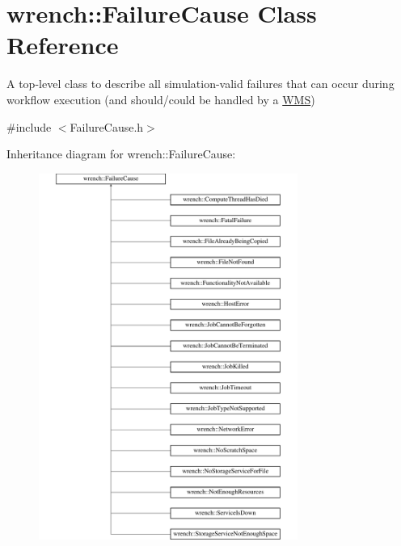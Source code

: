 \hypertarget{classwrench_1_1_failure_cause}{}\section{wrench\+:\+:Failure\+Cause Class Reference}
\label{classwrench_1_1_failure_cause}


A top-\/level class to describe all simulation-\/valid failures that can occur during workflow execution (and should/could be handled by a \hyperlink{classwrench_1_1_w_m_s}{W\+MS})  




{\ttfamily \#include $<$Failure\+Cause.\+h$>$}

Inheritance diagram for wrench\+:\+:Failure\+Cause\+:\begin{figure}[H]
\begin{center}
\leavevmode
\includegraphics[height=12.000000cm]{classwrench_1_1_failure_cause}
\end{center}
\end{figure}
